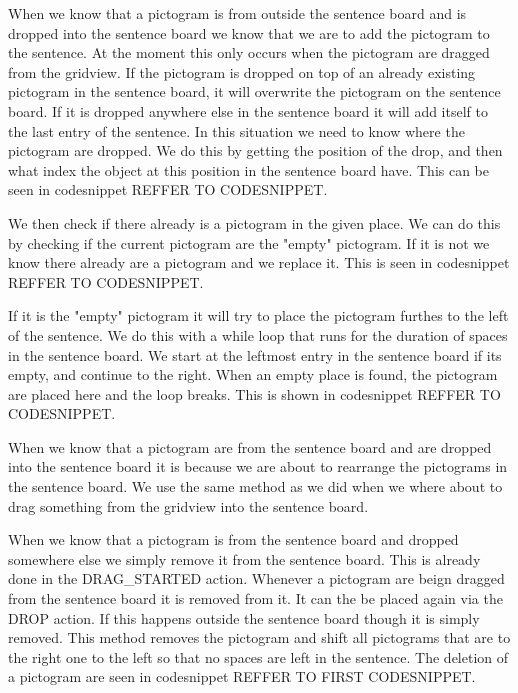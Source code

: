 When we know that a pictogram is from outside the sentence board and is dropped into the sentence board we know that we are to add the pictogram to the sentence. At the moment this only occurs when the pictogram are dragged from the gridview.
If the pictogram is dropped on top of an already existing pictogram in the sentence board, it will overwrite the pictogram on the sentence board. If it is dropped anywhere else in the sentence board it will add itself to the last entry of the sentence.
In this situation we need to know where the pictogram are dropped. 
We do this by getting the position of the drop, and then what index the object at this position in the sentence board have. 
This can be seen in codesnippet REFFER TO CODESNIPPET.


We then check if there already is a pictogram in the given place. We can do this by checking if the current pictogram are the "empty" pictogram. If it is not we know there already are a pictogram and we replace it.
This is seen in codesnippet REFFER TO CODESNIPPET.


If it is the "empty" pictogram it will try to place the pictogram furthes to the left of the sentence. 
We do this with a while loop that runs for the duration of spaces in the sentence board. We start at the leftmost entry in the sentence board if its empty, and continue to the right. 
When an empty place is found, the pictogram are placed here and the loop breaks.
This is shown in codesnippet REFFER TO CODESNIPPET.


When we know that a pictogram are from the sentence board and are dropped into the sentence board it is because we are about to rearrange the pictograms in the sentence board. We use the same method as we did when we where about to drag something from the gridview into the sentence board. 

When we know that a pictogram is from the sentence board and dropped somewhere else we simply remove it from the sentence board. This is already done in the DRAG\_STARTED action. Whenever a pictogram are beign dragged from the sentence board it is removed from it. It can the be placed again via the DROP action. If this happens outside the sentence board though it is simply removed. 
This method removes the pictogram and shift all pictograms that are to the right one to the left so that no spaces are left in the sentence. 
The deletion of a pictogram are seen in codesnippet REFFER TO FIRST CODESNIPPET.

